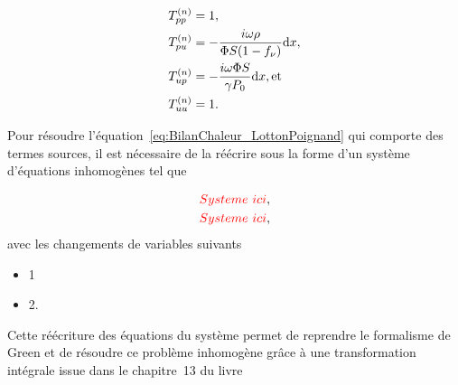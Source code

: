 \begin{subequations}
	\begin{align}
		T_{pp}^{(n)} &= 1, \label{eq:TMatrix_Tpp_regen}\\
		T_{pu}^{(n)} &= -\frac{i \omega \rho}{\Phi S (1-f_\nu)}\mathrm{d} x, \label{eq:TMatrix_Tpu_regen}\\
		T_{up}^{(n)} &= -\frac{i \omega \Phi S}{\gamma P_0} \mathrm{d} x, \text{et} \label{eq:TMatrix_Tup_regen}\\
		T_{uu}^{(n)} &= 1. \label{eq:TMatrix_Tuu_regen}
	\end{align}
	\label{eq:TMatrix_regen}
\end{subequations}

Pour résoudre l'équation~\eqref{eq:BilanChaleur_LottonPoignand} qui comporte des termes sources, il est nécessaire de la réécrire sous la forme d'un système d'équations inhomogènes tel que

\begin{subequations}
	\begin{align}
		\textcolor{red}{Systeme\ ici},\label{eq:1_LottonPoignand}\\
		\textcolor{red}{Systeme\ ici},\label{eq:2_LottonPoignand}
	\end{align}
	\label{eq:SystemeEq_LottonPoignand}
\end{subequations}
avec les changements de variables suivants

\begin{itemize} \color{red}
	\item 1
	\item 2.
\end{itemize}

Cette réécriture des équations du système permet de reprendre le formalisme de Green et de résoudre ce problème inhomogène grâce à une transformation intégrale issue dans le chapitre~13 du livre \cite{ozisik_heat_1993, ozisik_integraltransform_heat_1993}






